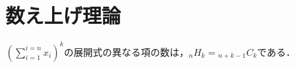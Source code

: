 \section{数え上げ理論}

\begin{theorem}
  $\displaystyle (\sum_{i=1}^{i=n} x_i)^k$の展開式の異なる項の数は，${}_n H_{k} = {}_{n+k-1} C_{k}$である．
\end{theorem}
